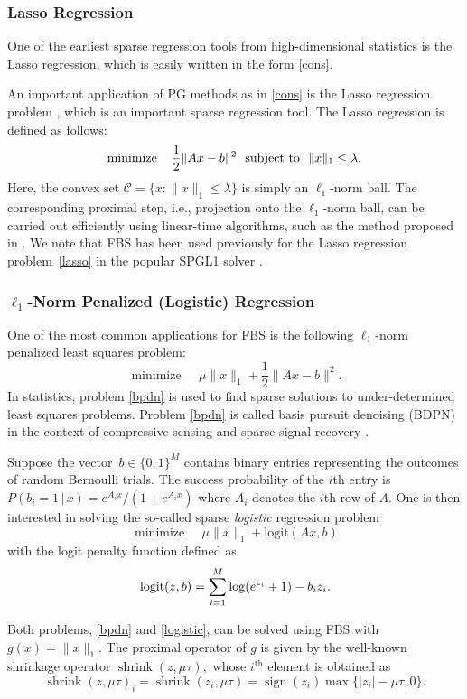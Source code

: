 \documentclass{amsart}
\newcommand{\half}{\frac{1}{2}}
\newcommand{\eqn}[2]{\begin{equation}\label{#1}#2\end{equation}}
\newcommand{\st}{\hbox{ \,\,subject to\,\, }}
\newcommand{\ellone}{$\ell_1$}
\DeclareMathOperator*{\minimize}{minimize\quad}
\DeclareMathOperator*{\sign}{sign}
\DeclareMathOperator*{\shrink}{shrink}
\theoremstyle{definition}
\begin{document}
\subsubsection{Lasso Regression}
One of the earliest sparse regression tools from high-dimensional statistics is the Lasso regression, which is easily written in the form \eqref{cons}.

An important application of PG methods as in \eqref{cons} is the Lasso regression problem \cite{Tibshirani94}, which is an important sparse regression tool.  The Lasso regression is defined as follows:
\eqn{lasso}{
 \minimize   \half \| Ax-b \|^2
 \st \|x\|_1\le \lambda.
}
Here, the convex set $\mathcal{C} = \{x: \|x\|_1\le \lambda \}$ is simply an \ellone-norm ball.  
The corresponding  proximal step, i.e., projection onto the \ellone{}-norm ball, can be carried out efficiently using linear-time algorithms, such as the method proposed in \cite{DSSC08}. We note that FBS has been used previously for the Lasso regression problem~\eqref{lasso} in the  popular SPGL1 solver \cite{VF07,VF08}.



\subsubsection{{$\boldsymbol \ell_1$}-Norm Penalized (Logistic) Regression} \label{sec:l1ls}

One of the most common applications for FBS is the following \ellone{}-norm penalized least squares problem:
\eqn{bpdn}{
 \minimize  \mu \|x\|_1 + \half \| Ax-b \|^2.
}
In statistics, problem \eqref{bpdn} is used to find sparse solutions to under-determined least squares problems. 
Problem \eqref{bpdn}  is called basis pursuit denoising (BDPN) in the context of compressive sensing and sparse signal recovery  \cite{FNW07,KL10}.

Suppose the vector~$b\in\{0,1\}^M$ contains binary entries representing the outcomes of random Bernoulli trials.  The success probability of the $i$th entry is 
 $P(b_i=1\, |\,x)=e^{A_i x}/(1+e^{A_ix} )$ where $A_i$ denotes the $i$th row of $A.$
 One is then interested in solving the so-called sparse \emph{logistic} regression problem
\eqn{logistic}{
 \minimize  \mu \|x\|_1 + \mathrm{logit}(Ax,b)
}
with the logit penalty function defined as 
\eqn{loglink}{
\mathrm{logit}(z,b) =  \sum_{i=1}^{M} \log(e^{z_i}+1)  - b_iz_i. \notag
}

Both problems, \eqref{bpdn} and \eqref{logistic}, can be solved using FBS with $g(x) = \|x\|_1.$  The proximal operator  of $g$ is given by the well-known shrinkage operator $\shrink(z,\mu\tau),$ whose $i^\text{th}$ element  is obtained as  
 \eqn{shrink}  {
  \shrink(z,\mu\tau)_i = \shrink(z_i,\mu\tau)=   \sign(z_i) \max\{|z_i|-\mu\tau ,0\}.
  }
\end{document}
